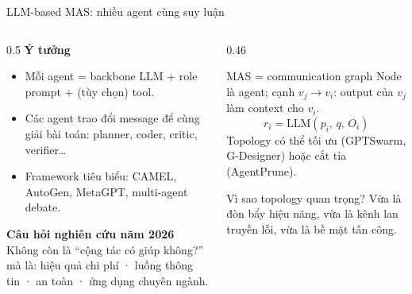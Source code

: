 \documentclass[aspectratio=169,10pt]{beamer}
\begin{document}
\begin{frame}{LLM-based MAS: nhiều agent cùng suy luận}
  \begin{columns}[T]
    \begin{column}{0.5\textwidth}
      \textbf{Ý tưởng}
      \begin{itemize}
        \item Mỗi agent = backbone LLM + role prompt + (tùy chọn) tool.
        \item Các agent trao đổi message để cùng giải bài toán: planner, coder, critic, verifier…
        \item Framework tiêu biểu: CAMEL, AutoGen, MetaGPT, multi-agent debate.
      \end{itemize}
      \vspace{4pt}
      \textbf{Câu hỏi nghiên cứu năm 2026}\\
      Không còn là “cộng tác có giúp không?” mà là:
      hiệu quả chi phí · luồng thông tin · an toàn · ứng dụng chuyên ngành.
    \end{column}
    \begin{column}{0.46\textwidth}
      \begin{block}{MAS = communication graph}
        Node là agent; cạnh $v_j \to v_i$: output của $v_j$ làm context cho $v_i$.
        \[ r_i = \mathrm{LLM}(p_i,\, q,\, O_i) \]
        Topology có thể tối ưu (GPTSwarm, G-Designer) hoặc cắt tỉa (AgentPrune).
      \end{block}
      \begin{alertblock}{Vì sao topology quan trọng?}
        Vừa là đòn bẩy hiệu năng, vừa là kênh lan truyền lỗi, vừa là bề mặt tấn công.
      \end{alertblock}
    \end{column}
  \end{columns}
\end{frame}
\end{document}
